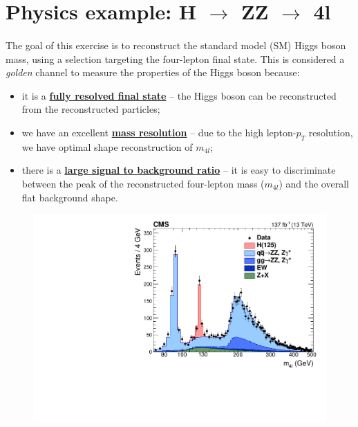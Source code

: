 \section{Physics example: H $\rightarrow$ ZZ $\rightarrow$ 4l}
\justifying
\paragraph{}
The goal of this exercise is to reconstruct the standard model (SM) Higgs boson mass, using a selection targeting the four-lepton final state. This is considered a \textit{golden} channel to measure the properties of the Higgs boson because:
\begin{itemize}
	\item it is a \textbf{\underline{ fully resolved final state}} -- the Higgs boson can be reconstructed from the reconstructed particles;
	\item we have an excellent \textbf{\underline{ mass resolution}} -- due to the high lepton-$p_T$ resolution, we have optimal shape reconstruction of $m_{4l}$;
	\item there is a \textbf{\underline{ large signal to background ratio}} -- it is easy to discriminate between the peak of the reconstructed four-lepton mass ($m_{4l}$) and the overall flat background shape.
\end{itemize}

\begin{figure}[t]
	\centering
	\includegraphics[width=\textwidth]{images/CMS-HIG-19-001_Figure_004-a.pdf}
	\label{higgs_plot}
\end{figure}
